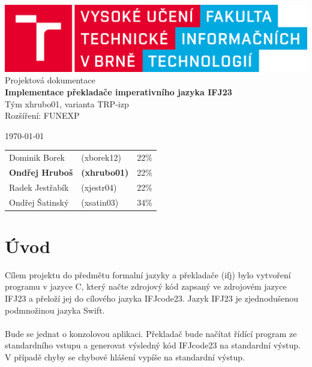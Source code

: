 \documentclass[12pt]{article}
\begin{document}
    \begin{titlepage}
        \begin{center}
            \includegraphics[width=0.77\linewidth]{img/fit_logo.png} \\
            \Huge{Projektová dokumentace} \\
            \Large{\textbf{Implementace překladače imperativního jazyka IFJ23}} \\
            \Large{Tým xhrubo01, varianta TRP-izp} \\ 
            \Large{Rozšíření: FUNEXP}\\
        \end{center}
        \begin{minipage}{0.4 \textwidth}
			{\Large \today}
		\end{minipage}
		\hfill
		\begin{minipage}[r]{0.6 \textwidth}
			\normalsize
            \begin{flushright}
                \begin{tabular}{l l l}
    				Dominik Borek & (xborek12) & 22\%\\
    				\textbf{Ondřej Hruboš} & \textbf{(xhrubo01)} & 22\%\\
    				Radek Jestřabík & (xjestr04)  & 22\%\\
    				Ondřej Šatinský & (xsatin03)  & 34\%\\
    			\end{tabular}
            \end{flushright}
		\end{minipage}
      \newpage
    \end{titlepage}

\begin{center}
\renewcommand{\contentsname}{Obsah}
    \tableofcontents
    \clearpage
\end{center}
 
\section{Úvod}
Cílem projektu do předmětu formalní jazyky a překladače (ifj) bylo vytvoření programu v jazyce C, který načte zdrojový kód zapsaný ve zdrojovém jazyce IFJ23 a přeloží jej do cílového jazyka IFJcode23. Jazyk IFJ23 je zjednodušenou podmnožinou jazyka Swift. 
\\  \\
Bude se jednat o konzolovou aplikaci. Překladač bude načítat řídící program ze standardního vstupu a generovat výsledný kód IFJcode23 na standardní výstup. V případě chyby se chybové hlášení vypíše na standardní výstup.
\end{document}
